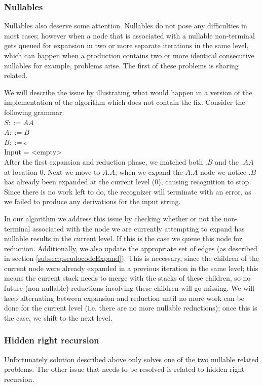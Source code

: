 \documentclass[a4paper,10pt]{article}
\begin{document}
\subsubsection{Nullables}
\label{subsec:nullables}
Nullables also deserve some attention. Nullables do not pose any difficulties in most cases; however when a node that is associated with a nullable non-terminal gets queued for expansion in two or more separate iterations in the same level, which can happen when a production contains two or more identical consecutive nullables for example, problems arise. The first of these problems is sharing related.

We will describe the issue by illustrating what would happen in a version of the implementation of the algorithm which does not contain the fix.
Consider the following grammar:\\
$S ::= AA$\\
$A ::= B$\\
$B ::= \epsilon$\\
Input = <empty>\\
After the first expansion and reduction phase, we matched both $.B$ and the $.AA$ at location $0$. Next we move to $A.A$; when we expand the $A.A$ node we notice $.B$ has already been expanded at the current level ($0$), causing recognition to stop. Since there is no work left to do, the recognizer will terminate with an error, as we failed to produce any derivations for the input string.

In our algorithm we address this issue by checking whether or not the non-terminal associated with the node we are currently attempting to expand has nullable results in the current level. If this is the case we queue this node for reduction. Additionally, we also update the appropriate set of edges (as described in section \ref{subsec:pseudocodeExpand}). This is necessary, since the children of the current node were already expanded in a previous iteration in the same level; this means the current stack needs to merge with the stacks of these children, so no future (non-nullable) reductions involving these children will go missing. We will keep alternating between expansion and reduction until no more work can be done for the current level (i.e. there are no more nullable reductions); once this is the case, we shift to the next level.

\subsubsection{Hidden right recursion}
\label{subsec:hiddenRightRecursion}
Unfortunately solution described above only solves one of the two nullable related problems. The other issue that needs to be resolved is related to hidden right recursion.
\end{document}
